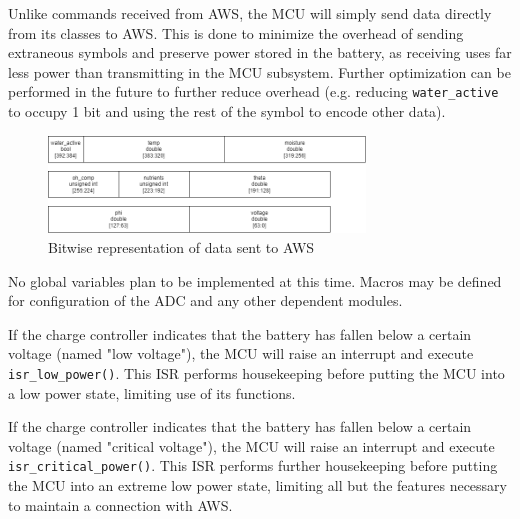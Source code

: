 \begin{flushleft}
    Unlike commands received from AWS, the MCU will simply send data directly
    from its classes to AWS. This is done to minimize the overhead of sending
    extraneous symbols and preserve power stored in the battery, as receiving
    uses far less power than transmitting in the MCU subsystem. Further
    optimization can be performed in the future to further reduce overhead
    (e.g. reducing \texttt{water\_active} to occupy 1 bit and using the rest of
    the symbol to encode other data).
    \begin{figure}[H]
        \caption{Bitwise representation of data sent to AWS}
        \label{toweb_encoding}
        \centering
        \includegraphics[width=0.75\textwidth]{images/toweb_encoding.png}
    \end{figure}
\end{flushleft}
\begin{flushleft}
    No global variables plan to be implemented at this time. Macros may be
    defined for configuration of the ADC and any other dependent modules.
\end{flushleft}
\begin{flushleft}
    If the charge controller indicates that the battery has fallen below a
    certain voltage (named "low voltage"), the MCU will raise an interrupt and
    execute \texttt{isr\_low\_power()}. This ISR performs housekeeping before
    putting the MCU into a low power state, limiting use of its functions.
\end{flushleft}
\begin{flushleft}
    If the charge controller indicates that the battery has fallen below a
    certain voltage (named "critical voltage"), the MCU will raise an interrupt
    and execute \texttt{isr\_critical\_power()}. This ISR performs further 
    housekeeping before putting the MCU into an extreme low power state,
    limiting all but the features necessary to maintain a connection with AWS.
\end{flushleft}
